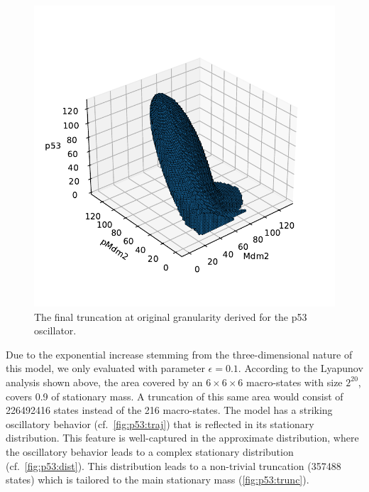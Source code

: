 \begin{figure}[htb]
  \centering
  \begin{minipage}{0.9\textwidth}
    \centering
    \includegraphics[width=\textwidth]{gfx/trunc_p53.pdf}
  \end{minipage}
  \caption{The final truncation at original granularity derived for
  the p53 oscillator.}
  \label{fig:p53:trunc}
\end{figure}
Due to the exponential increase stemming from the
three-di\-men\-sion\-al nature of this model, we only evaluated with
parameter $\epsilon=0.1$.
According to the Lyapunov analysis shown above, the area covered by
an $6\times 6\times 6$ macro-states with size $2^{20}$, covers
\num{0.9} of stationary mass.
A truncation of this same area would consist of \num{226492416}
states instead of the \num{216} macro-states.
The model has a striking oscillatory behavior
(cf.\ \autoref{fig:p53:traj}) that is reflected in its stationary distribution.
This feature is well-captured in the approximate distribution, where
the oscillatory behavior leads to a complex stationary distribution
(cf.\ \autoref{fig:p53:dist}).
This distribution leads to a non-trivial truncation (\num{357488}
states) which is tailored to the main stationary mass (\autoref{fig:p53:trunc}).
